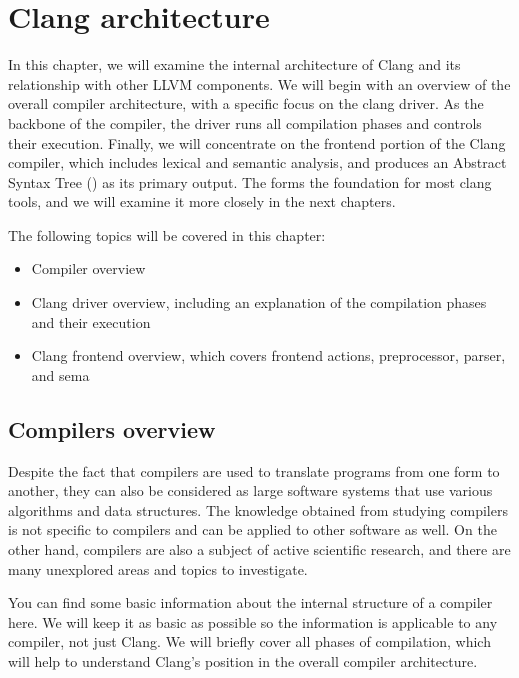 \chapter{Clang architecture}
\pagestyle{fancy}
\fancyhf{}
\rhead{\thepage}

In this chapter, we will examine the internal architecture of Clang and its
relationship with other LLVM components. We will begin with an overview of the
overall compiler architecture, with a specific focus on the clang driver. As the
backbone of the compiler, the driver runs all compilation phases and controls
their execution. Finally, we will concentrate on the frontend portion of the
Clang compiler, which includes lexical and semantic analysis, and produces an
Abstract Syntax Tree (\myast) as its primary output. The \myast forms the
foundation for most clang tools, and we will examine it more closely in the next
chapters. 

The following topics will be covered in this chapter:
\begin{itemize}
\item Compiler overview
\item Clang driver overview, including an explanation of the compilation phases
  and their execution 
\item Clang frontend overview, which covers frontend actions, preprocessor,
  parser, and sema 
\end{itemize}

\section{Compilers overview}
\label{sec:compiler_overview}
Despite the fact that compilers are used to translate programs from one form to
another, they can also be considered as large software systems that use various
algorithms and data structures. The knowledge obtained from studying compilers
is not specific to compilers and can be applied to other software as well. On
the other hand, compilers are also a subject of active scientific research, and
there are many unexplored areas and topics to investigate. 

You can find some basic information about the internal structure of a compiler
here. We will keep it as basic as possible so the information is applicable
to any compiler, not just Clang. We will briefly cover all phases of
compilation, which will help to understand Clang's position in the overall
compiler architecture.

